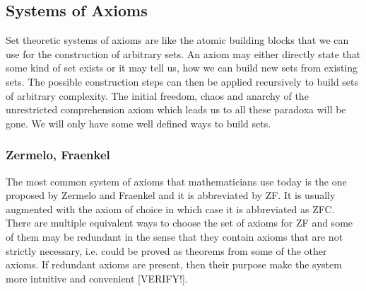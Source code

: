 
\subsection{Systems of Axioms}
Set theoretic systems of axioms are like the atomic building blocks that we can use for the construction of arbitrary sets. An axiom may either directly state that some kind of set exists or it may tell us, how we can build new sets from existing sets. The possible construction steps can then be applied recursively to build sets of arbitrary complexity. The initial freedom, chaos and anarchy of the unrestricted comprehension axiom which leads us to all these paradoxa will be gone. We will only have some well defined ways to build sets.

\subsubsection{Zermelo, Fraenkel}
The most common system of axioms that mathematicians use today is the one proposed by Zermelo and Fraenkel and it is abbreviated by ZF. It is usually augmented with the axiom of choice in which case it is abbreviated as ZFC. There are multiple equivalent ways to choose the set of axioms for ZF and some of them may be redundant in the sense that they contain axioms that are not strictly necessary, i.e. could be proved as theorems from some of the other axioms. If redundant axioms are present, then their purpose make the system more intuitive and convenient [VERIFY!].






